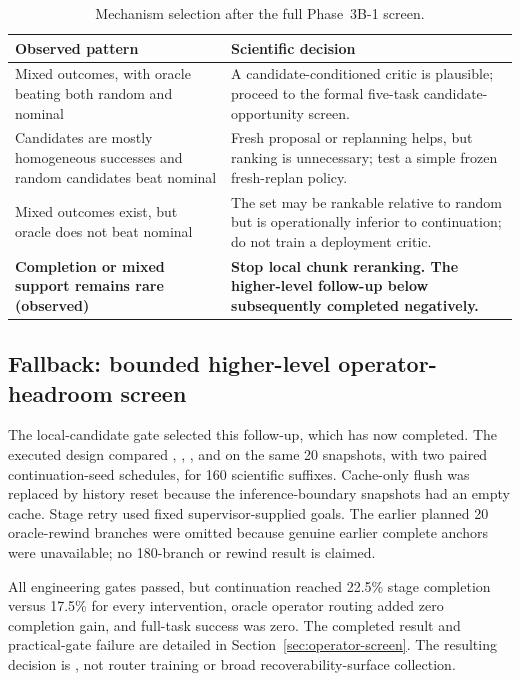\begin{table}[H]
\centering
\caption{Mechanism selection after the full Phase~3B-1 screen.}
\label{tab:phase3b-routing}
\small
\begin{tabularx}{\textwidth}{P{0.34\textwidth}Y}
\toprule
Observed pattern & Scientific decision \\
\midrule
Mixed outcomes, with oracle beating both random and nominal & A candidate-conditioned critic is plausible; proceed to the formal five-task candidate-opportunity screen. \\
Candidates are mostly homogeneous successes and random candidates beat nominal & Fresh proposal or replanning helps, but ranking is unnecessary; test a simple frozen fresh-replan policy. \\
Mixed outcomes exist, but oracle does not beat nominal & The set may be rankable relative to random but is operationally inferior to continuation; do not train a deployment critic. \\
\textbf{Completion or mixed support remains rare (observed)} & \textbf{Stop local chunk reranking. The higher-level follow-up below subsequently completed negatively.} \\
\bottomrule
\end{tabularx}
\end{table}

\subsection{Fallback: bounded higher-level operator-headroom screen}

The local-candidate gate selected this follow-up, which has now completed. The executed design compared , , , and  on the same 20 snapshots, with two paired continuation-seed schedules, for 160 scientific suffixes. Cache-only flush was replaced by history reset because the inference-boundary snapshots had an empty cache. Stage retry used fixed supervisor-supplied goals. The earlier planned 20 oracle-rewind branches were omitted because genuine earlier complete anchors were unavailable; no 180-branch or rewind result is claimed.

All engineering gates passed, but continuation reached 22.5\% stage completion versus 17.5\% for every intervention, oracle operator routing added zero completion gain, and full-task success was zero. The completed result and practical-gate failure are detailed in Section~\ref{sec:operator-screen}. The resulting decision is , not router training or broad recoverability-surface collection.


